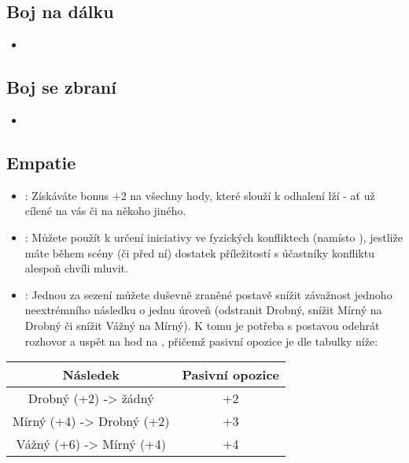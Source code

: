 \subsection{Boj na dálku}
\label{sec:trik-bnd}
\begin{itemize}
  \item
\end{itemize}
  
\subsection{Boj se zbraní}
\label{sec:trik-bsz}
\begin{itemize}
  \item
\end{itemize}

\subsection{Empatie}
\label{sec:trik-empatie}

\begin{itemize}
\item{}:
\label{sec:empatie-odhalovani} Získáváte bonus +2 na všechny hody, které slouží k odhalení lží - ať už cílené na vás či na někoho jiného.

\item{}:
\label{sec:empatie-cit} Můžete použít  k určení iniciativy ve fyzických konfliktech (namísto ), jestliže máte během scény (či před ní) dostatek příležitostí s účastníky konfliktu alespoň chvíli mluvit.

\item{}:
\label{sec:empatie-terapuet} Jednou za sezení můžete duševně zraněné postavě snížit závažnost jednoho neextrémního následku o jednu úroveň (odstranit Drobný, snížit Mírný na Drobný či snížit Vážný na Mírný). K tomu je potřeba s postavou odehrát rozhovor a uspět na hod na , přičemž pasivní opozice je dle tabulky níže:
\end{itemize}

\begin{table}  
\centering
\begin{tabular}[h]{c|c}
Následek & Pasivní opozice \\ \hline
Drobný (+2) -> žádný & +2 \\
Mírný (+4) -> Drobný (+2) & +3 \\
Vážný (+6) -> Mírný (+4) & +4\\
\end{tabular}
\end{table}

